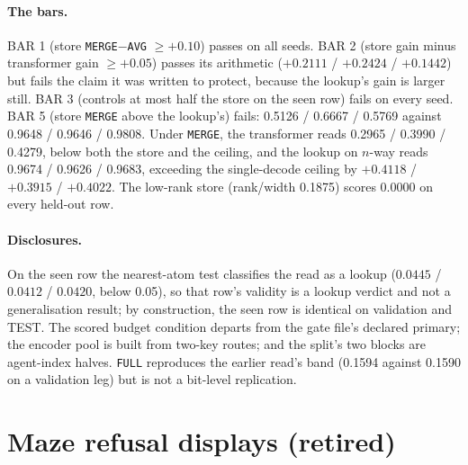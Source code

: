 \documentclass{article} %
\begin{document}
\paragraph{The bars.} BAR 1 (store \texttt{MERGE}$-$\texttt{AVG} $\ge+0.10$) passes on all seeds.
BAR 2 (store gain minus transformer gain $\ge+0.05$) passes its arithmetic ($+0.2111$ / $+0.2424$
/ $+0.1442$) but fails the claim it was written to protect, because the lookup's gain is larger
still. BAR 3 (controls at most half the store on the seen row) fails on every seed. BAR 5 (store
\texttt{MERGE} above the lookup's) fails: 0.5126 / 0.6667 / 0.5769 against 0.9648 / 0.9646 /
0.9808. Under \texttt{MERGE}, the transformer reads 0.2965 / 0.3990 / 0.4279, below both the store
and the ceiling, and the lookup on $n$-way reads 0.9674 / 0.9626 / 0.9683, exceeding the
single-decode ceiling by $+0.4118$ / $+0.3915$ / $+0.4022$. The low-rank store
(rank/width 0.1875) scores 0.0000 on every held-out row. %

\paragraph{Disclosures.} On the seen row the nearest-atom test classifies the read as a lookup
($0.0445$ / $0.0412$ / $0.0420$, below 0.05), so that row's validity is a lookup verdict and not a
generalisation result; by construction, the seen row is identical on validation and TEST. The
scored budget condition departs from the gate file's declared primary; the encoder pool is built
from two-key routes; and the split's two blocks are agent-index halves. \texttt{FULL} reproduces
the earlier read's band (0.1594 against 0.1590 on a validation leg) but is not a bit-level
replication. %

\section{Maze refusal displays (retired)}
\label{app:mazerefusal}
\end{document}
